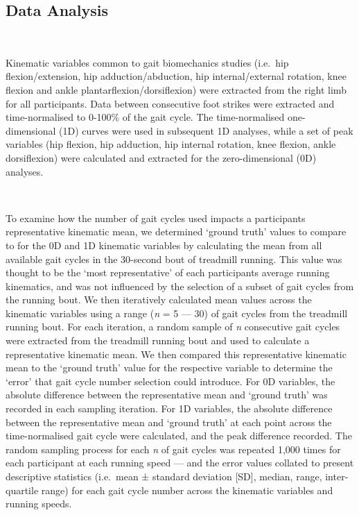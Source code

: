 \documentclass[]{elsarticle} %
\begin{document}
\hypertarget{data-analysis}{%
\subsection{Data Analysis}\label{data-analysis}}

~

Kinematic variables common to gait biomechanics studies (i.e.~hip
flexion/extension, hip adduction/abduction, hip internal/external
rotation, knee flexion and ankle plantarflexion/dorsiflexion) were
extracted from the right limb for all participants. Data between
consecutive foot strikes were extracted and time-normalised to 0-100\%
of the gait cycle. The time-normalised one-dimensional (1D) curves were
used in subsequent 1D analyses, while a set of peak variables (hip
flexion, hip adduction, hip internal rotation, knee flexion, ankle
dorsiflexion) were calculated and extracted for the zero-dimensional
(0D) analyses.

~

To examine how the number of gait cycles used impacts a participants
representative kinematic mean, we determined `ground truth' values to
compare to for the 0D and 1D kinematic variables by calculating the mean
from all available gait cycles in the 30-second bout of treadmill
running. This value was thought to be the `most representative' of each
participants average running kinematics, and was not influenced by the
selection of a subset of gait cycles from the running bout. We then
iteratively calculated mean values across the kinematic variables using
a range (\emph{n} = 5 --- 30) of gait cycles from the treadmill running
bout. For each iteration, a random sample of \emph{n} consecutive gait
cycles were extracted from the treadmill running bout and used to
calculate a representative kinematic mean. We then compared this
representative kinematic mean to the `ground truth' value for the
respective variable to determine the `error' that gait cycle number
selection could introduce. For 0D variables, the absolute difference
between the representative mean and `ground truth' was recorded in each
sampling iteration. For 1D variables, the absolute difference between
the representative mean and `ground truth' at each point across the
time-normalised gait cycle were calculated, and the peak difference
recorded. The random sampling process for each \emph{n} of gait cycles
was repeated 1,000 times for each participant at each running speed ---
and the error values collated to present descriptive statistics
(i.e.~mean ± standard deviation {[}SD{]}, median, range, inter-quartile
range) for each gait cycle number across the kinematic variables and
running speeds.
\end{document}
